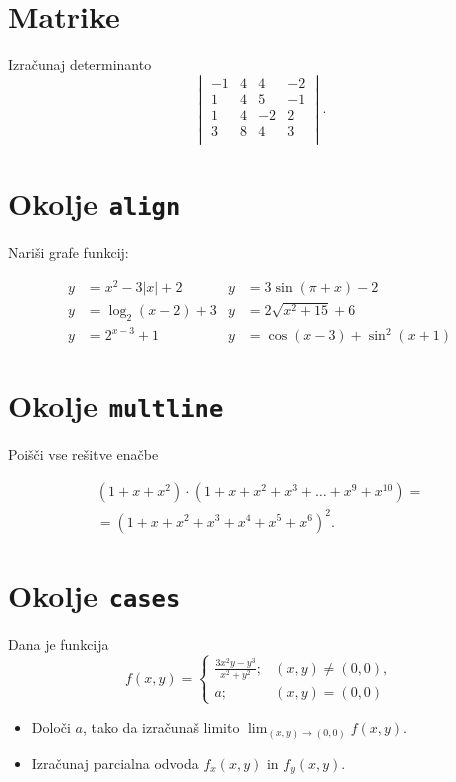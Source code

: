 \documentclass[a4paper,12pt]{article}
\begin{document}
\section*{Matrike}
Izračunaj determinanto
\[
\begin{vmatrix}
    -1 & 4 & 4 & -2 \\
    1 & 4 & 5 & -1 \\
    1 & 4 & -2 & 2 \\
    3 & 8 & 4 & 3 \\
\end{vmatrix}.
\]
\section*{Okolje \texttt{align}}
Nariši grafe funkcij:


\begin{align*}
y &= x^2 - 3|x| + 2   & y &= 3 \sin(\pi+x) - 2 \\
y &= \log_2(x-2) + 3  & y &= 2 \sqrt{x^2+15} + 6 \\
y &= 2^{x-3} + 1      & y &= \cos(x-3) + \sin^2(x+1) 
\end{align*}



\section*{Okolje \texttt{multline}}
Poišči vse rešitve enačbe

\begin{multline*}
   (1+x+x^2) \cdot (1+x+x^2+x^3+\ldots+x^9+x^{10}) = \\
   =(1+x+x^2+x^3+x^4+x^5+x^6)^2.
\end{multline*}


\section*{Okolje \texttt{cases}}
Dana je funkcija
\[
  f(x,y)=
  \begin{cases}
  \frac{3x^2y-y^3}{x^2+y^2}; &(x,y) \not=(0,0), \\
  a; &(x,y)=(0,0)
  \end{cases}
\]
\begin{itemize}
\item Določi \(a\), tako da izračunaš limito \( \lim_{(x,y)\to(0,0)} f(x,y) \).
\item Izračunaj parcialna odvoda \(f_x(x,y)\) in \(f_y(x,y)\).
\end{itemize}
\end{document}
